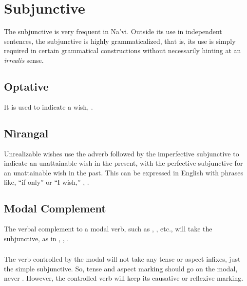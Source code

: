 \section{Subjunctive}
\noindent The subjunctive is very frequent in Na'vi.  Outside its use in
independent sentences, the sub\-junct\-ive is highly grammaticalized, that
is, its use is simply required in certain grammatical constructions
without necessarily hinting at an \textit{irrealis} sense.

\subsection{Optative} It is used to indicate a wish,  .

\subsection{Nìrangal} Unrealizable wishes use the adverb 
followed by the imperfective subjunctive to indicate an unattainable
wish in the present, with the perfective subjunctive for an
unattainable wish in the past.  This can be expressed in English with
phrases like, ``if only'' or ``I wish,''  ,
 .

\subsection{Modal Complement} 
The verbal complement to a modal verb, such as  ,
 , etc., will take the subjunctive, as in  ,  ,  . \label{syn:modals}


\subsubsection{} \label{syn:modal-syntax} The verb controlled by the
modal will not take any tense or aspect infixes, just the simple
subjunctive.  So, tense and aspect marking should go on the
modal,   never .  However, the controlled verb will keep its causative or
reflexive marking.

